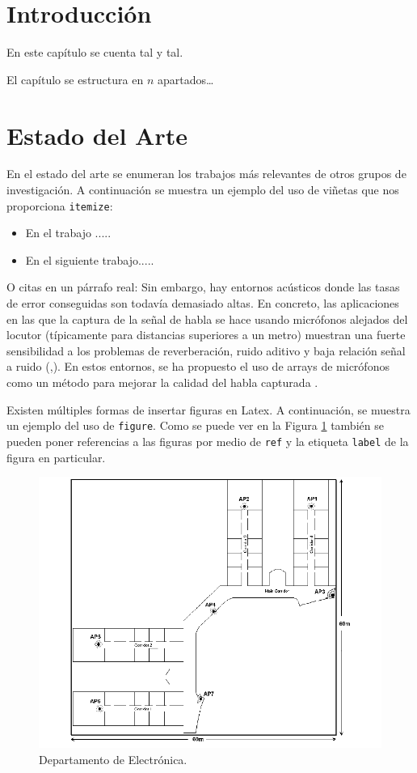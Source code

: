 \documentclass[spanish,openright]{book}
\begin{document}
\section{Introducción}
\label{sec:introduccion-teoria}

En este capítulo se cuenta tal y tal.

El capítulo se estructura en $n$ apartados\ldots


\section{Estado del Arte}
\label{sec:estadoarte}

En el estado del arte se enumeran los trabajos más relevantes de otros
grupos de investigación. A continuación se muestra un ejemplo del uso de
viñetas que nos proporciona \texttt{itemize}:

\begin{itemize}
\item En el trabajo .....
\item En el siguiente trabajo.....
\end{itemize}

O citas en un párrafo real: Sin embargo, hay entornos acústicos donde
las tasas de error conseguidas son todavía demasiado altas. En concreto,
las aplicaciones en las que la captura de la señal de habla se hace
usando micrófonos alejados del locutor (típicamente para distancias
superiores a un metro) muestran una fuerte sensibilidad a los problemas
de reverberación, ruido aditivo y baja relación señal a ruido
(\cite{gelbart02},\cite{kochkin02}). En estos entornos, se ha propuesto
el uso de arrays de micrófonos como un método para mejorar la calidad
del habla capturada \cite{seltzer03}\cite{herbordt05}.

Existen múltiples formas de insertar figuras en Latex. A continuación,
se muestra un ejemplo del uso de \texttt{figure}. Como se puede ver en
la Figura \ref{fig:fig1} también se pueden poner referencias a las figuras
por medio de \texttt{ref} y la etiqueta \texttt{label} de la figura en
particular.

\begin{figure}[h] \centering
\includegraphics[width=4.7in]{Figure1}
\caption{Departamento de Electrónica.}
\label{fig:fig1}
\end{figure}
\end{document}
